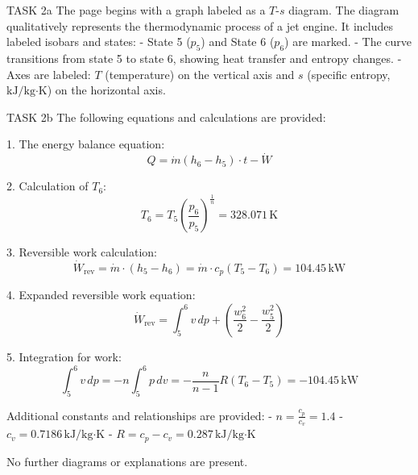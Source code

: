 TASK 2a  
The page begins with a graph labeled as a \( T \)-\( s \) diagram. The diagram qualitatively represents the thermodynamic process of a jet engine. It includes labeled isobars and states:  
- State 5 (\( p_5 \)) and State 6 (\( p_6 \)) are marked.  
- The curve transitions from state 5 to state 6, showing heat transfer and entropy changes.  
- Axes are labeled: \( T \) (temperature) on the vertical axis and \( s \) (specific entropy, \( \text{kJ/kg·K} \)) on the horizontal axis.  

TASK 2b  
The following equations and calculations are provided:  

1. The energy balance equation:  
\[
Q = \dot{m} (h_6 - h_5) \cdot t - \dot{W}
\]

2. Calculation of \( T_6 \):  
\[
T_6 = T_5 \left( \frac{p_6}{p_5} \right)^{\frac{1}{n}} = 328.071 \, \text{K}
\]

3. Reversible work calculation:  
\[
\dot{W}_{\text{rev}} = \dot{m} \cdot (h_5 - h_6) = \dot{m} \cdot c_p (T_5 - T_6) = 104.45 \, \text{kW}
\]

4. Expanded reversible work equation:  
\[
\dot{W}_{\text{rev}} = \int_5^6 v \, dp + \left( \frac{w_6^2}{2} - \frac{w_5^2}{2} \right)
\]

5. Integration for work:  
\[
\int_5^6 v \, dp = -n \int_5^6 p \, dv = -\frac{n}{n-1} R (T_6 - T_5) = -104.45 \, \text{kW}
\]

Additional constants and relationships are provided:  
- \( n = \frac{c_p}{c_v} = 1.4 \)  
- \( c_v = 0.7186 \, \text{kJ/kg·K} \)  
- \( R = c_p - c_v = 0.287 \, \text{kJ/kg·K} \)  

No further diagrams or explanations are present.